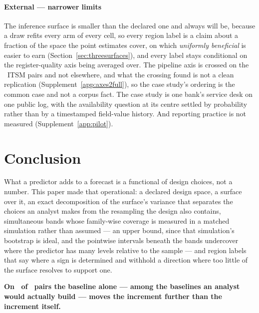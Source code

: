 \paragraph{External --- narrower limits}
The inference surface is smaller than the declared one and always will be,
because a draw refits every arm of every cell, so every region label is a
claim about a fraction of the space the point estimates cover, on which
\emph{uniformly beneficial} is easier to earn
(Section~\ref{sec:threesurfaces}), and every label stays conditional on the
register-quality axis being averaged over. The pipeline axis is crossed on the
\nItsmCrossed\ ITSM pairs and not elsewhere, and what the crossing found is
not a clean replication (Supplement~\ref{app:axes2full}), so the case study's
ordering is the common case and not a corpus fact. The case study is one
bank's service desk on one public log, with the availability question at its
centre settled by probability rather than by a timestamped field-value
history. And reporting practice is not measured (Supplement~\ref{app:pilot}).

\section{Conclusion}
\label{sec:conclusion}
\label{sec:conc}

What a predictor adds to a forecast is a functional of design choices, not a
number. This paper made that operational: a declared design space, a surface
over it, an exact decomposition of the surface's variance that separates the
choices an analyst makes from the resampling the design also contains,
simultaneous bands whose family-wise coverage is measured in a matched
simulation rather than assumed --- an upper bound, since that simulation's
bootstrap is ideal, and the pointwise intervals beneath the bands undercover
where the predictor has many levels relative to the sample --- and region
labels that say where a sign is determined and withhold a direction where too
little of the surface resolves to support one.

\textbf{On \nSpreadExceedsRealistic\ of \nPairs\ pairs the baseline alone
--- among the baselines an analyst would actually build --- moves the
increment further than the increment itself.}


